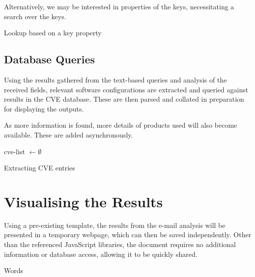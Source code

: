 Alternatively, we may be interested in properties of the keys, necessitating a search over the keys.

\begin{algorithm}
	\caption{Lookup based on a key property}
\end{algorithm}

\subsection{Database Queries}
Using the results gathered from the text-based queries and analysis of the received fields, relevant software configurations are extracted and queried against results in the CVE database.  These are then parsed and collated in preparation for displaying the outputs.

As more information is found, more details of products used will also become available.  These are added asynchronously.

\begin{algorithm}
	cve-list $\gets\emptyset$\;
	\;
	\caption{Extracting CVE entries}
\end{algorithm}

\section{Visualising the Results}

Using a pre-existing template, the results from the e-mail analysis will be presented in a temporary webpage, which can then be saved independently.  Other than the referenced JavaScript libraries, the document requires no additional information or database access, allowing it to be quickly shared.

\begin{algorithm}\caption{Words}
\end{algorithm}
